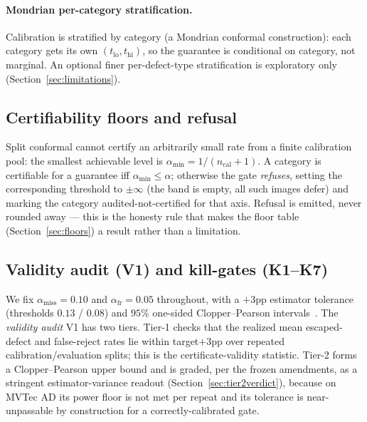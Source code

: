 \documentclass[11pt]{article}
\begin{document}
\paragraph{Mondrian per-category stratification.} Calibration is stratified by category (a Mondrian
conformal construction): each category gets its own $(t_{\text{lo}}, t_{\text{hi}})$, so the
guarantee is conditional on category, not marginal. An optional finer per-defect-type
stratification is exploratory only (Section~\ref{sec:limitations}).

\subsection{Certifiability floors and refusal}
\label{sec:floor}

Split conformal cannot certify an arbitrarily small rate from a finite calibration pool: the
smallest achievable level is $\alpha_{\min} = 1/(n_{\text{cal}}+1)$. A category is certifiable for a
guarantee iff $\alpha_{\min} \le \alpha$; otherwise the gate \emph{refuses}, setting the
corresponding threshold to $\pm\infty$ (the band is empty, all such images defer) and marking the
category audited-not-certified for that axis. Refusal is emitted, never rounded away
--- this is the honesty rule that makes the floor table (Section~\ref{sec:floors}) a result rather
than a limitation.

\subsection{Validity audit (V1) and kill-gates (K1--K7)}
\label{sec:v1}

We fix $\alpha_{\text{miss}}=0.10$ and $\alpha_{\text{fr}}=0.05$ throughout, with a $+3$pp
estimator tolerance (thresholds $0.13$ / $0.08$) and $95\%$ one-sided Clopper--Pearson
intervals~\citep{clopper1934use}.
The \emph{validity audit} V1 has two tiers. Tier-1 checks that the realized mean escaped-defect and
false-reject rates lie within target$+3$pp over repeated calibration/evaluation splits; this is the
certificate-validity statistic. Tier-2 forms a Clopper--Pearson upper bound and is graded, per the
frozen amendments, as a stringent estimator-variance readout (Section~\ref{sec:tier2verdict}),
because on MVTec AD its power floor is not met per repeat and its tolerance is near-unpassable by
construction for a correctly-calibrated gate.
\end{document}
